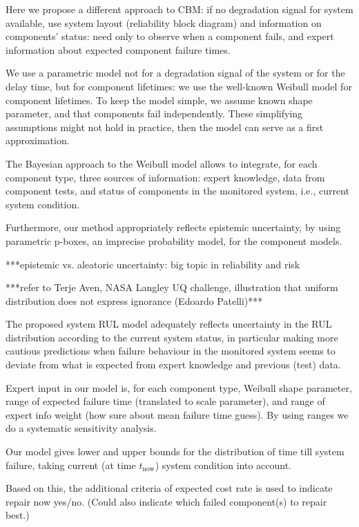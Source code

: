 \documentclass[authoryear]{elsarticle}
\def\tnow{t_\text{now}}
\begin{document}
Here we propose a different approach to CBM: if no degradation signal for system available,
use system layout (reliability block diagram) and information on components' status:
need only to observe when a component fails,
and expert information about expected component failure times.

We use a parametric model not for a degradation signal of the system or for the delay time, but for component lifetimes:
we use the well-known Weibull model for component lifetimes.
To keep the model simple, we assume known shape parameter,
and that components fail independently.
These simplifying assumptions might not hold in practice,
then the model can serve as a first approximation.

The Bayesian approach to the Weibull model allows to integrate, for each component type,
three sources of information: expert knowledge, data from component tests,
and status of components in the monitored system, i.e., current system condition.

Furthermore, our method appropriately reflects epistemic uncertainty,
by using parametric p-boxes, an imprecise probability model, for the component models.

***epistemic vs. aleatoric uncertainty: big topic in reliability and risk

***refer to Terje Aven, NASA Langley UQ challenge, illustration that uniform distribution does not express ignorance (Edoardo Patelli)***

The proposed system RUL model adequately reflects uncertainty in the RUL distribution
according to the current system status,
in particular making more cautious predictions when failure behaviour in the monitored system
seems to deviate from what is expected from expert knowledge and previous (test) data.

Expert input in our model is, for each component type,
Weibull shape parameter, range of expected failure time (translated to scale parameter),
and range of expert info weight (how sure about mean failure time guess).
By using ranges we do a systematic sensitivity analysis.

Our model gives lower and upper bounds for the distribution of time till system failure,
taking current (at time $\tnow$) system condition into account.

Based on this, the additional criteria of expected cost rate is used to indicate repair now yes/no.
(Could also indicate which failed component(s) to repair best.)
\end{document}

